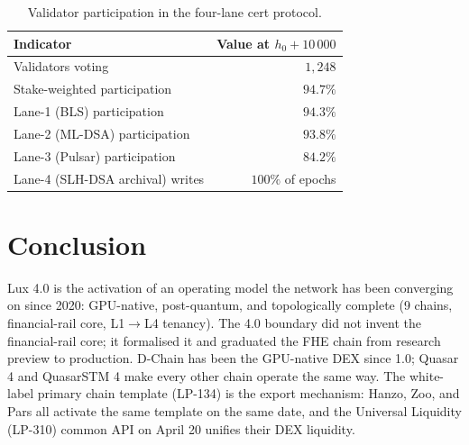 \documentclass[11pt,a4paper]{article}
\begin{document}
\begin{table}[H]
\centering
\small
\begin{tabular}{lr}
\toprule
\textbf{Indicator} & \textbf{Value at $h_0 + 10\,000$} \\
\midrule
Validators voting & $1{,}248$ \\
Stake-weighted participation & $94.7\%$ \\
Lane-1 (BLS) participation & $94.3\%$ \\
Lane-2 (ML-DSA) participation & $93.8\%$ \\
Lane-3 (Pulsar) participation & $84.2\%$ \\
Lane-4 (SLH-DSA archival) writes & $100\%$ of epochs \\
\bottomrule
\end{tabular}
\caption{Validator participation in the four-lane cert protocol.}
\end{table}

\section{Conclusion}
\label{sec:conclusion}

Lux 4.0 is the activation of an operating model the network has been
converging on since 2020: GPU-native, post-quantum, and topologically
complete (9 chains, financial-rail core, L1$\to$L4 tenancy). The 4.0
boundary did not invent the financial-rail core; it formalised it and
graduated the FHE chain from research preview to production.
D-Chain has been the GPU-native DEX since 1.0; Quasar 4 and QuasarSTM 4
make every other chain operate the same way. The white-label primary
chain template (LP-134) is the export mechanism: Hanzo, Zoo, and Pars
all activate the same template on the same date, and the Universal
Liquidity (LP-310) common API on April 20 unifies their DEX liquidity.
\end{document}
